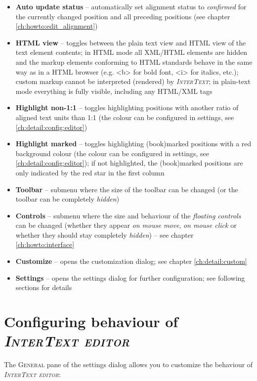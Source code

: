 \documentclass[a4paper,10pt,oneside]{book}
\newcommand{\IT}{\textit{\textsc{InterText}}\xspace}
\newcommand{\ITeditor}{\textit{\textsc{InterText editor}}\xspace}
\newcommand{\menu}[1]{\textsc{#1}}
\begin{document}
\begin{itemize}
 \item \textbf{Auto update status} -- automatically set alignment status to \emph{confirmed} for the currently changed position and all preceding positions (see chapter \ref{ch:howto:edit_alignment})
 \item \textbf{HTML view} -- toggles between the plain text view and HTML view of the text element contents; in HTML mode all XML/HTML elements are hidden and the markup elements conforming to HTML standards behave in the same way as in a HTML browser (e.g. <b> for bold font, <i> for italics, etc.); custom markup cannot be interpreted (rendered) by \IT; in plain-text mode everything is fully visible, including any HTML/XML tags
 \item \textbf{Highlight non-1:1} -- toggles highlighting positions with another ratio of aligned text units than 1:1 (the colour can be configured in settings, see \ref{ch:detail:config:editor})
 \item \textbf{Highlight marked} -- toggles highlighting (book)marked positions with a red background colour (the colour can be configured in settings, see \ref{ch:detail:config:editor}); if not highlighted, the (book)marked positions are only indicated by the red star in the first column
 \item \textbf{Toolbar} -- submenu where the size of the toolbar can be changed (or the toolbar can be completely \emph{hidden})
 \item \textbf{Controls} -- submenu where the size and behaviour of the \emph{floating controls} can be changed (whether they appear \emph{on mouse move}, \emph{on mouse click} or whether they should stay completely \emph{hidden}) -- see chapter \ref{ch:howto:interface}
 \item \textbf{Customize} -- opens the customization dialog; see chapter \ref{ch:detail:custom}
 \item \textbf{Settings} -- opens the settings dialog for further configuration; see following sections for details
\end{itemize}

\section{Configuring behaviour of \ITeditor}\label{ch:detail:config:general}

The \menu{General} pane of the settings dialog allows you to customize the behaviour of \ITeditor:
\end{document}
